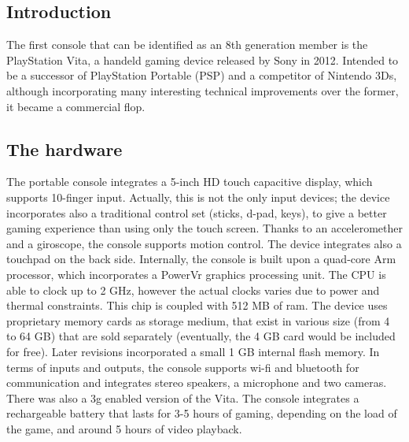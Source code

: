 \documentclass[a4paper,10pt]{book}
\begin{document}
 \subsection{ Introduction  }
  The first console that can be identified as an 8th generation member is the PlayStation Vita, a handeld gaming device released by Sony in 2012. Intended to be a successor of PlayStation Portable (PSP) and a competitor of Nintendo 3Ds, although incorporating many interesting technical improvements over the former, it became a commercial flop.  
 \subsection{ The hardware  }
  The portable console integrates a 5-inch HD touch capacitive display, which supports 10-finger input. Actually, this is not the only input devices; the device incorporates also a traditional control set (sticks, d-pad, keys), to give a better gaming experience than using only the touch screen. Thanks to an acceleromether and a giroscope, the console supports motion control. The device integrates also a touchpad on the back side.  
  Internally, the console is built upon a quad-core Arm processor, which incorporates a PowerVr graphics processing unit. The CPU is able to clock up to 2 GHz, however the actual clocks varies due to power and thermal constraints. This chip is coupled with 512 MB of ram.  
  The device uses proprietary memory cards as storage medium, that exist in various size (from 4 to 64 GB) that are sold separately (eventually, the 4 GB card would be included for free). Later revisions incorporated a small 1 GB internal flash memory.  
  In terms of inputs and outputs, the console supports wi-fi and bluetooth for communication and integrates stereo speakers, a microphone and two cameras. There was also a 3g enabled version of the Vita.  
  The console integrates a rechargeable battery that lasts for 3-5 hours of gaming, depending on the load of the game, and around 5 hours of video playback.  
\end{document}
